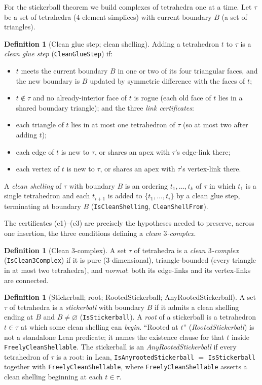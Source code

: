 \documentclass[11pt]{article}
\theoremstyle{plain}
\theoremstyle{definition}
\newtheorem{definition}[theorem]{Definition}
\theoremstyle{remark}
\newcommand{\code}[1]{\texttt{#1}}
\begin{document}
For the stickerball theorem we build complexes of tetrahedra one at a time. Let $\tau$ be a
set of tetrahedra ($4$-element simplices) with current boundary $B$ (a set of triangles).

\begin{definition}[Clean glue step; clean shelling]\label{def:clean}
Adding a tetrahedron $t$ to $\tau$ is a \emph{clean glue step} (\code{CleanGlueStep}) if:
\begin{itemize}
\item[(a)] $t$ meets the current boundary $B$ in one or two of its four triangular faces,
and the new boundary is $B$ updated by symmetric difference with the faces of $t$;
\item[(b)] $t\notin\tau$ and no already-interior face of $t$ is rogue (each old face of $t$
lies in a shared boundary triangle); and the three \emph{link certificates}:
\item[(c1)] each triangle of $t$ lies in at most one tetrahedron of $\tau$ (so at most two
after adding $t$);
\item[(c2)] each edge of $t$ is new to $\tau$, or shares an apex with $\tau$'s edge-link there;
\item[(c3)] each vertex of $t$ is new to $\tau$, or shares an apex with $\tau$'s vertex-link there.
\end{itemize}
A \emph{clean shelling} of $\tau$ with boundary $B$ is an ordering $t_1,\dots,t_k$ of $\tau$
in which $t_1$ is a single tetrahedron and each $t_{i+1}$ is added to $\{t_1,\dots,t_i\}$ by
a clean glue step, terminating at boundary $B$ (\code{IsCleanShelling},
\code{CleanShellFrom}).
\end{definition}

The certificates (c1)--(c3) are precisely the hypotheses needed to preserve, across one
insertion, the three conditions defining a \emph{clean $3$-complex}.

\begin{definition}[Clean $3$-complex]\label{def:clean3}
A set $\tau$ of tetrahedra is a \emph{clean $3$-complex} (\code{IsClean3Complex}) if it is
pure ($3$-dimensional), triangle-bounded (every triangle in at most two tetrahedra), and
\emph{normal}: both its edge-links and its vertex-links are connected.
\end{definition}

\begin{definition}[Stickerball; root; RootedStickerball; AnyRootedStickerball]\label{def:sb}
A set $\tau$ of tetrahedra is a \emph{stickerball} with boundary $B$ if it admits a clean
shelling ending at $B$ and $B\neq\varnothing$ (\code{IsStickerball}).
A \emph{root} of a stickerball is a tetrahedron $t\in\tau$ at which some clean shelling can
\emph{begin}. ``Rooted at $t$'' (\emph{RootedStickerball}) is not a standalone Lean predicate; it
names the existence clause for that $t$ inside \code{FreelyCleanShellable}. The stickerball is an
\emph{AnyRootedStickerball} if every tetrahedron of $\tau$ is a root: in Lean,
\code{IsAnyrootedStickerball} $=$ \code{IsStickerball} together with \code{FreelyCleanShellable},
where \code{FreelyCleanShellable} asserts a clean shelling beginning at each $t\in\tau$.
\end{definition}
\end{document}
